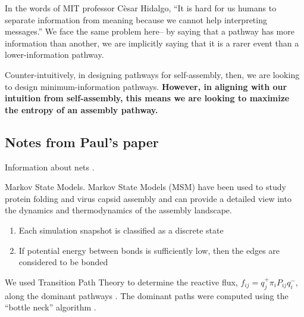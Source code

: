 
In the words of MIT professor C\`{e}sar Hidalgo, ``It is hard for us humans to separate information from meaning because we cannot help interpreting messages.'' 
We face the same problem here-- by saying that a pathway has more information than another, we are implicitly saying that it is a rarer event than a lower-information pathway.

Counter-intuitively, in designing pathways for self-assembly, then, we are looking to design minimum-information pathways.
\textbf{However, in aligning with our intuition from self-assembly, this means we are looking to maximize the entropy of an assembly pathway.}





\subsection{Notes from Paul's paper}

Information about nets \cite{HowtoFoldIt,GeometricFoldingAlgorithms}.

Markov State Models. Markov State Models (MSM) have been used to study protein folding \cite{Bowman_2010_PNAS,Noe_2009_PNAS} and virus capsid assembly \cite{Perkett_2014_JChemPhys} and can provide a detailed view into the dynamics and thermodynamics of the assembly landscape.

\begin{enumerate}
\item Each simulation snapshot is classified as a discrete state
\item If potential energy between bonds is sufficiently low, then the edges are considered to be bonded
\end{enumerate}

We used Transition Path Theory to determine the reactive flux, $f_{ij}=q_j^+\pi_iP_{ij}q_i^-$, along the dominant pathways \cite{Perkett_2014_JChemPhys,Metzner_2009_MMS,Weinan_2010_AnnRevPhysChem}.
The dominant paths were computed using the ``bottle neck'' algorithm \cite{Noe_2009_PNAS,Metzner_2009_MMS}.